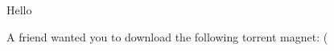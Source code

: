 \documentclass{article}
\begin{document}
Hello %

A friend wanted you to download the following torrent magnet: %
(%
\end{document}
